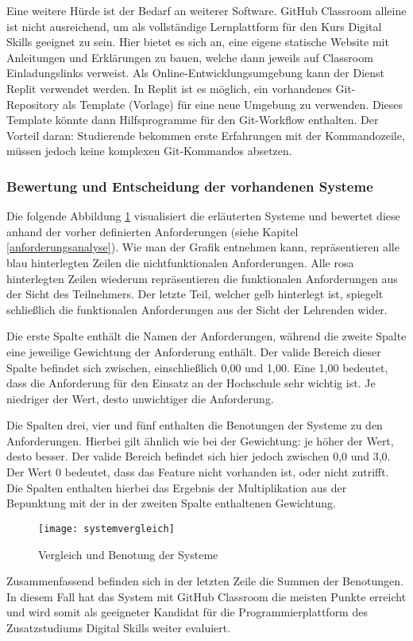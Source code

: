 Eine weitere Hürde ist der Bedarf an weiterer Software. GitHub Classroom alleine
ist nicht ausreichend, um als vollständige Lernplattform für den Kurs Digital
Skills geeignet zu sein. Hier bietet es sich an, eine eigene statische Website
mit Anleitungen und Erklärungen zu bauen, welche dann jeweils auf Classroom
Einladungslinks verweist. Als Online-Entwicklungsumgebung kann der Dienst Replit
verwendet werden. In Replit ist es möglich, ein vorhandenes Git-Repository als
Template (Vorlage) für eine neue Umgebung zu verwenden. Dieses Template könnte
dann Hilfsprogramme für den Git-Workflow enthalten. Der Vorteil daran:
Studierende bekommen erste Erfahrungen mit der Kommandozeile, müssen jedoch
keine komplexen Git-Kommandos absetzen.

\subsubsection{Bewertung und Entscheidung der vorhandenen Systeme}
Die folgende Abbildung \ref{fig:systemvergleich} visualisiert die erläuterten
Systeme und bewertet diese anhand der vorher definierten Anforderungen (siehe 
Kapitel \ref{anforderungsanalyse}). Wie man der Grafik entnehmen kann,
repräsentieren alle blau hinterlegten Zeilen die nichtfunktionalen
Anforderungen. Alle rosa hinterlegten Zeilen wiederum repräsentieren die
funktionalen Anforderungen aus der Sicht des Teilnehmers. Der letzte Teil,
welcher gelb hinterlegt ist, spiegelt schließlich die funktionalen Anforderungen
aus der Sicht der Lehrenden wider.

Die erste Spalte enthält die Namen der Anforderungen, während die zweite Spalte
eine jeweilige Gewichtung der Anforderung enthält. Der valide Bereich dieser
Spalte befindet sich zwischen, einschließlich 0,00 und 1,00. Eine 1,00 bedeutet,
dass die Anforderung für den Einsatz an der Hochschule sehr wichtig ist. Je
niedriger der Wert, desto unwichtiger die Anforderung.

Die Spalten drei, vier und fünf enthalten die Benotungen der Systeme zu den
Anforderungen. Hierbei gilt ähnlich wie bei der Gewichtung: je höher der Wert,
desto besser. Der valide Bereich befindet sich hier jedoch zwischen 0,0 und 3,0.
Der Wert 0 bedeutet, dass das Feature nicht vorhanden ist, oder nicht zutrifft.
Die Spalten enthalten hierbei das Ergebnis der Multiplikation aus der Bepunktung
mit der in der zweiten Spalte enthaltenen Gewichtung.

\begin{figure}[H]
    \centering
    \texttt{[image: systemvergleich]}
    \caption{Vergleich und Benotung der Systeme}
    \label{fig:systemvergleich}
\end{figure}

Zusammenfassend befinden sich in der letzten Zeile die Summen der Benotungen. In
diesem Fall hat das System mit GitHub Classroom die meisten Punkte erreicht und
wird somit als geeigneter Kandidat für die Programmierplattform des
Zusatzstudiums Digital Skills weiter evaluiert.